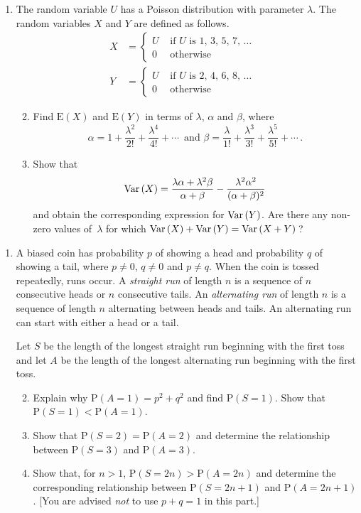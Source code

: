 \documentclass[a4, 11pt]{report}
\newlength{\qspace}
\newcounter{qnumber}
\newenvironment{question}%
 {\vspace{\qspace}
  \begin{enumerate}[\bfseries 1\quad][10]%
    \setcounter{enumi}{\value{qnumber}}%
    \item%
 }
{
  \end{enumerate}
  \filbreak
  \stepcounter{qnumber}
 }
\newenvironment{questionparts}[1][1]%
 {
  \begin{enumerate}[\bfseries (i)]%
    \setcounter{enumii}{#1}
    \addtocounter{enumii}{-1}
    \setlength{\itemsep}{5mm}
    \setlength{\parskip}{8pt}
 }
 {
  \end{enumerate}
 }
\def\E{{\mathrm E}}
\def\P{{\mathrm P}}
\def\var{{\rm Var}\,}
\begin{document}
\begin{question}
The random variable $U$ has a Poisson distribution with parameter
$\lambda$. The random variables $X$ and $Y$ are defined as follows.
\begin{align*}
X&=
 \begin{cases} 
U & \text{ if $U$ is 1, 3, 5, 7, $\ldots\,$} \\
0 & \text{ otherwise}
\end{cases}
\\
Y&=
 \begin{cases} 
U & \text{ if $U$ is 2, 4, 6, 8, $\ldots\,$ } \\
0 & \text{ otherwise} 
\end{cases}
\end{align*}


\begin{questionparts}
\item Find $\E(X)$ and $\E(Y)$ in terms of $\lambda$, $\alpha$ and 
$\beta$, where
\[
\alpha = 1+\frac{\lambda^2}{2!}+\frac{\lambda^4}{4!} +\cdots\,
\text{ \ \ and \ \ }
\beta = \frac{\lambda}{1!} + \frac{\lambda^3}{3!} + \frac{\lambda^5}{5!}
+\cdots\,.
\]
\item
Show that 
\[
\var(X) = \frac{\lambda\alpha+\lambda^2\beta}{\alpha+\beta}
 - \frac{\lambda^2\alpha^2}{(\alpha+\beta)^2}
\]
and obtain the corresponding expression for $\var(Y)$. Are there any 
non-zero values of~$\lambda$ for which 
$ \var(X) + \var(Y) = \var(X+Y)\,$? 
\end{questionparts}
\end{question}

\begin{question}
A biased coin has probability $p$ of showing a head
and probability $q$ of showing a tail, where $p\ne0$, $q\ne0$
and $p\ne q$. When the coin is tossed repeatedly, runs occur. 
A {\em straight run} of length $n$ is a sequence of $n$ consecutive
heads or $n$ consecutive tails. An {\em alternating run} of length 
$n$ is a sequence of length $n$ alternating between heads and tails. An 
alternating run can start with either a head or a tail.

Let $S$ be the length of the longest straight run beginning with the
first toss and let $A$ be the  length of the longest 
alternating  run beginning with the
first toss.

\begin{questionparts}
\item Explain why  $\P(A=1)=p^2+q^2$ and find $\P(S=1)$. Show that
 $\P(S=1)<\P(A=1)$.
\item Show that
$\P(S=2)= \P(A=2)$
and determine the relationship between
$\P(S=3)$ and $ \P(A=3)$.

 \item Show that, for $n>1$, $\P(S=2n)>\P(A=2n)$ and determine
the corresponding relationship between $\P(S=2n+1)$ and $\P(A=2n+1)$.
[You are advised {\em not} to  use $p+q=1$ in this part.] 
\end{questionparts}
\end{question}
\end{document}
